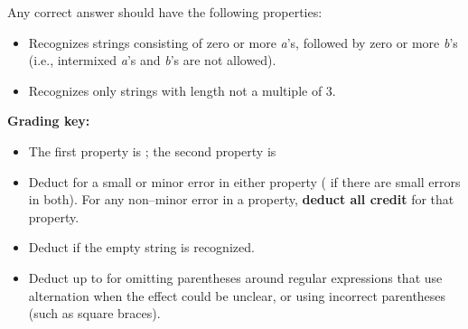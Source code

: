 \documentclass[11pt,fleqn]{article}
\begin{document}
\begin{enumerate}
\begin{centering}
          \end{centering}

          \medskip

          Any correct answer should have the following properties:

          \vspace{-1.5mm}

          \begin{itemize}

            \item Recognizes strings consisting of zero or more \emph{a}'s,
                  followed by zero or more \emph{b}'s (i.e., intermixed
                  \emph{a}'s and \emph{b}'s are not allowed).

            \item Recognizes only strings with length not a multiple of 3.

          \end{itemize}

          \vspace{-1.75mm}

          \begin{info}{\textbf{Grading key:}}

            \vspace{-2.25mm}

            \begin{itemize}

              \addtolength{\itemsep}{1mm}

              \item The first property is ; the second
                    property is 

              \item Deduct  for a small or minor error in either
                    property ( if there are small errors in both).
                    For any non--minor error in a property, \textbf{deduct
                    all credit} for that property.

              \item Deduct  if the empty string is recognized.

              \item Deduct up to  for omitting parentheses around
                    regular expressions that use alternation when the
                    effect could be unclear, or using incorrect parentheses
                    (such as square braces).


\end{itemize}
\end{info}
\end{enumerate}
\end{document}
